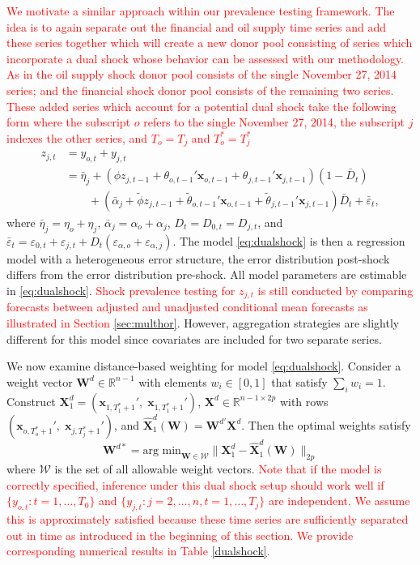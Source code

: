 \documentclass[11pt]{article}
\newcommand{\R}{\mathbb{R}}
\newcommand{\x}{\textbf{x}}
\newcommand{\X}{\textbf{X}}
\theoremstyle{definition}
\begin{document}
\textcolor{red}{We motivate a similar approach within our prevalence testing framework. The idea is to again separate out the financial and oil supply time series and add these series together which will create a new donor pool consisting of series which incorporate a dual shock whose behavior can be assessed with our methodology. As in \cite{lin2021minimizing} the oil supply shock donor pool consists of the single November 27, 2014 series; and the financial shock donor pool consists of the remaining two series. These added series which account for a potential dual shock take the following form where the subscript $o$ refers to the single November 27, 2014, the subscript $j$ indexes the other series, and $T_o = T_j$ and $T^*_o = T^*_j$}
\begin{equation} \label{eq:dualshock}
\begin{split}
  z_{j,t} &= y_{o,t} + y_{j,t} \\
  	&= \bar{\eta}_j + (\phi z_{j,t-1} +\theta_{o,t-1}'\x_{o,t-1} +\theta_{j,t-1}'\x_{j,t-1})(1 - \bar{D}_t) \\
  	&\qquad + (\bar{\alpha}_j + \tilde{\phi} z_{j,t-1} + \tilde{\theta}_{o,t-1}'\x_{o,t-1}   + \tilde{\theta}_{j,t-1}'\x_{j,t-1})\bar{D}_t + \bar{\varepsilon}_t,
\end{split}
\end{equation}
where $\bar{\eta}_j = \eta_o + \eta_j$, $\bar{\alpha}_j = \alpha_o + \alpha_j$, $D_t = D_{0,t} = D_{j,t}$, and $\bar{\varepsilon}_t = \varepsilon_{0,t} + \varepsilon_{j,t} + D_t(\varepsilon_{\alpha,o} + \varepsilon_{\alpha,j})$. The model \eqref{eq:dualshock} is then a regression model with a heterogeneous error structure, the error distribution post-shock differs from the error distribution pre-shock. All model parameters are estimable in \eqref{eq:dualshock}. \textcolor{red}{Shock prevalence testing for $z_{j,t}$ is still conducted by comparing forecasts between adjusted and unadjusted conditional mean forecasts as illustrated in Section \ref{sec:multhor}}. However, aggregation strategies are slightly different for this model since covariates are included for two separate series. 

We now examine distance-based weighting for model \eqref{eq:dualshock}. Consider a weight vector $\textbf{W}^d \in \R^{n-1}$ with elements $w_i \in [0,1]$ that satisfy $\sum_i w_i = 1$. Construct $\X_1^d = (\x_{1,T^*_1+1}', \; \x_{1,T^*_1+1}')$, $\X^d \in \R^{n-1 \times 2p}$ with rows $(\x_{o,T^*_o+1}', \; \x_{j,T^*_j+1}')$, and $\hat{\X}_1^d(\textbf{W}) = \textbf{W}^{d'}\X^d$. Then the optimal weights satisfy 
$$
  \textbf{W}^{d*} = \text{arg min}_{\textbf{W} \in \mathcal{W}} \|\X_1^d - \hat{\X}_1^d(\textbf{W})\|_{2p}
$$
where $\mathcal{W}$ is the set of all allowable weight vectors. \textcolor{red}{Note that if the model is correctly specified,   inference under this dual shock setup should work well if $\{y_{o,t}\colon t= 1, \ldots, T_0\}$ and $\{y_{j, t} \colon j = 2, \ldots, n, t = 1, \ldots, T_j\}$ are independent. We assume this is approximately satisfied because these time series are sufficiently separated out in time as introduced in the beginning of this section. We provide corresponding numerical results   in Table \ref{dualshock}.}
\end{document}
